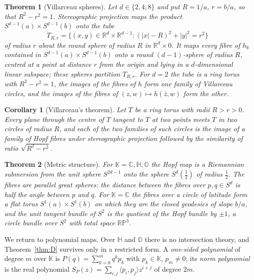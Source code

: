 \documentclass[11pt]{amsart}
\numberwithin{equation}{section}
\theoremstyle{plain}
\newtheorem{corollary}[theorem]{Corollary}
\newtheorem{maintheorem}{Theorem}
\theoremstyle{definition}
\theoremstyle{remark}
\newcommand{\R}{\mathbb{R}}
\newcommand{\C}{\mathbb{C}}
\newcommand{\Hq}{\mathbb{H}}
\newcommand{\Oc}{\mathbb{O}}
\newcommand{\K}{\mathbb{K}}
\newcommand{\RP}{\mathbb{RP}}
\begin{document}
\begin{maintheorem}[Villarceau spheres]\label{thm:E}
Let $d\in\{2,4,8\}$ and put $R=1/a$, $r=b/a$, so that $R^2-r^2=1$. Stereographic projection maps the product $S^{d-1}(a)\times S^{d-1}(b)$ onto the tube
\[
T_{R,r}=\bigl\{(x,y)\in\R^d\times\R^{d-1}:(|x|-R)^2+|y|^2=r^2\bigr\}
\]
of radius $r$ about the round sphere of radius $R$ in $\R^d\times0$. It maps every fibre of $h_\K$ contained in $S^{d-1}(a)\times S^{d-1}(b)$ onto a round $(d-1)$-sphere of radius $R$, centred at a point at distance $r$ from the origin and lying in a $d$-dimensional linear subspace; these spheres partition $T_{R,r}$. For $d=2$ the tube is a ring torus with $R^2-r^2=1$, the images of the fibres of $h$ form one family of Villarceau circles, and the images of the fibres of $(z,w)\mapsto h(\bar z,w)$ form the other.
\end{maintheorem}

\begin{corollary}[Villarceau's theorem]\label{cor:intro-villarceau}
Let $T$ be a ring torus with radii $R>r>0$. Every plane through the centre of $T$ tangent to $T$ at two points meets $T$ in two circles of radius $R$, and each of the two families of such circles is the image of a family of Hopf fibres under stereographic projection followed by the similarity of ratio $\sqrt{R^2-r^2}$.
\end{corollary}

\begin{maintheorem}[Metric structure]\label{thm:F}
For $\K=\C,\Hq,\Oc$ the Hopf map is a Riemannian submersion from the unit sphere $S^{2d-1}$ onto the sphere $S^d(\tfrac12)$ of radius $\tfrac12$. The fibres are parallel great spheres: the distance between the fibres over $p,q\in S^d$ is half the angle between $p$ and $q$. For $\K=\C$ the fibres over a circle of latitude form a flat torus $S^1(a)\times S^1(b)$ on which they are the closed geodesics of slope $b/a$, and the unit tangent bundle of $S^2$ is the quotient of the Hopf bundle by $\pm1$, a circle bundle over $S^2$ with total space $\RP^3$.
\end{maintheorem}

We return to polynomial maps. Over $\Hq$ and $\Oc$ there is no intersection theory, and Theorem~\ref{thm:D} survives only in a restricted form. A \emph{one-sided polynomial} of degree $m$ over $\K$ is $P(q)=\sum_{k=0}^mq^kp_k$ with $p_k\in\K$, $p_m\neq0$; its \emph{norm polynomial} is the real polynomial $S_P(z)=\sum_{i,j}\langle p_i,p_j\rangle z^{i+j}$ of degree $2m$.
\end{document}
